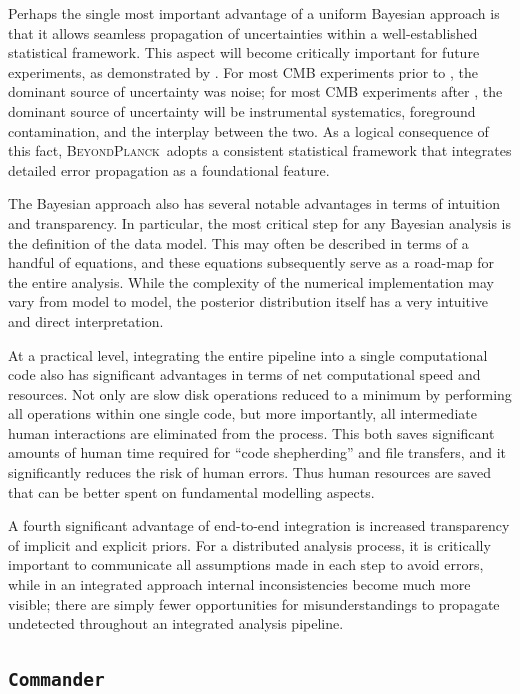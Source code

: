 \documentclass[onecolumn]{aa}
\def\commander{\texttt{Commander}}
\newcommand{\BP}{\textsc{BeyondPlanck}}
\begin{document}
Perhaps the single most important advantage of a uniform Bayesian
approach is that it allows seamless propagation of uncertainties
within a well-established statistical framework. This aspect will become critically
important for future experiments, as demonstrated by \Planck. For most
CMB experiments prior to \Planck, the dominant source of uncertainty
was noise; for most CMB experiments after \Planck, the dominant source
of uncertainty will be instrumental systematics, foreground
contamination, and the interplay between the two.  As a logical
consequence of this fact, \BP\ adopts a consistent statistical
framework that integrates detailed error propagation as a foundational
feature.

The Bayesian approach also has several notable advantages in terms of
intuition and transparency. In particular, the most critical step for
any Bayesian analysis is the definition of the data model. This may
often be described in terms of a handful of equations, and these
equations subsequently serve as a road-map for the entire
analysis. While the complexity of the numerical implementation may
vary from model to model, the posterior distribution itself has a very
intuitive and direct interpretation.

At a practical level, integrating the entire pipeline into a single
computational code also has significant advantages in terms of net
computational speed and resources. Not only are slow disk operations
reduced to a minimum by performing all operations within one single
code, but more importantly, all intermediate human interactions are
eliminated from the process. This both saves significant amounts of
human time required for ``code shepherding'' and file transfers, and
it significantly reduces the risk of human errors. Thus human
resources are saved that can be better spent on fundamental modelling
aspects.

A fourth significant advantage of end-to-end integration is increased
transparency of implicit and explicit priors. For a distributed
analysis process, it is critically important to communicate all
assumptions made in each step to avoid errors, while in an integrated
approach internal inconsistencies become much more visible; there are
simply fewer opportunities for misunderstandings to propagate
undetected throughout an integrated analysis pipeline.


\subsection{\commander}
\label{sec:commander}
\end{document}
